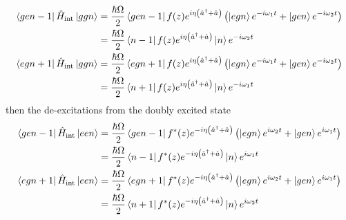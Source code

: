 \begin{align*}
	\bra{gen - 1}\hat{H}_{\text{int}} \ket{ggn} &= \frac{\hbar \Omega}{2}\bra{gen - 1}f(z) e^{i \eta\left( \hat{a}^{\dagger} + \hat{a} \right) } \left(  \ket{egn}e^{- i\omega_1 t } + \ket{gen}e^{- i\omega_2 t }   \right) \\
	&= \frac{\hbar \Omega}{2}  \bra{n-1} f(z) e^{i \eta\left( \hat{a}^{\dagger} + \hat{a} \right) } \ket{n}e^{- i\omega_2 t }   \\
	\bra{egn + 1}\hat{H}_{\text{int}} \ket{ggn} &= \frac{\hbar \Omega}{2}\bra{egn + 1}f(z) e^{i \eta\left( \hat{a}^{\dagger} + \hat{a} \right) } \left(  \ket{egn}e^{- i\omega_1 t } + \ket{gen}e^{- i\omega_2 t }   \right) \\
	&= \frac{\hbar \Omega}{2}\bra{n + 1}f(z) e^{i \eta\left( \hat{a}^{\dagger} + \hat{a} \right) } \ket{n}e^{- i\omega_1 t }
\end{align*}
then the de-excitations from the doubly excited state
\begin{align*}
	\bra{gen - 1}\hat{H}_{\text{int}} \ket{een} &= \frac{\hbar \Omega}{2}\bra{gen - 1} f^*(z) e^{-i \eta\left( \hat{a}^{\dagger} + \hat{a} \right) } \left(  \ket{egn}e^{ i\omega_2 t } + \ket{gen}e^{i\omega_1t }   \right)\\
	&= \frac{\hbar \Omega}{2}\bra{n - 1} f^*(z) e^{-i \eta\left( \hat{a}^{\dagger} + \hat{a} \right) } \ket{n}e^{i\omega_1 t }   \\
	\bra{egn + 1}\hat{H}_{\text{int}} \ket{een} &= \frac{\hbar \Omega}{2}\bra{egn + 1} f^*(z) e^{-i \eta\left( \hat{a}^{\dagger} + \hat{a} \right) } \left(  \ket{egn}e^{ i\omega_2 t } + \ket{gen}e^{i\omega_1 t }   \right)\\
	&= \frac{\hbar \Omega}{2}\bra{n + 1} f^*(z) e^{-i \eta\left( \hat{a}^{\dagger} + \hat{a} \right) }  \ket{n}e^{ i\omega_2 t }
\end{align*}

